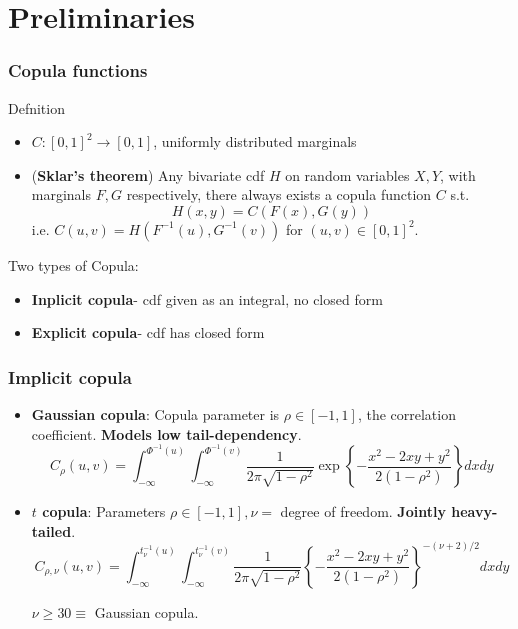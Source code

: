 \documentclass[handout,10pt]{beamer}
\newcommand{\colubf}{\color{UniBlue} \bf}
\begin{document}
\section{Preliminaries}

\begin{frame}
\frametitle{Copula functions}
\begin{block}{Defnition}
\begin{itemize}
\item $C:[0,1]^2\rightarrow [0,1]$, uniformly distributed marginals
\item (\textbf{Sklar's theorem}) Any bivariate cdf $H$ on random variables $X,Y$, with marginals $F,G$ respectively, there always exists a copula function $C$ s.t.
$$ H(x,y) = C(F(x),G(y)) $$
i.e. $C(u,v) = H(F^{-1}(u), G^{-1}(v))$ for $(u,v)\in[0,1]^2$.
\end{itemize}
\end{block}

Two types of Copula:
\begin{itemize}
\item \textbf{Inplicit copula}- cdf given as an integral, no closed form
\item \textbf{Explicit copula}- cdf has closed form
\end{itemize}
\end{frame}

\begin{frame}
\frametitle{Implicit copula}
\begin{example}
\begin{itemize}
\item \textbf{Gaussian copula}: Copula parameter is $\rho\in[-1,1]$, the correlation coefficient. {\colubf Models low tail-dependency}.
$$ C_\rho(u,v) = \int_{-\infty}^{\Phi^{-1}(u)}\int_{-\infty}^{\Phi^{-1}(v)} \frac{1}{2\pi\sqrt{1-\rho^2}} \exp\left\{-\frac{x^2-2xy+y^2}{2(1-\rho^2)}\right\}dxdy$$

\item \textbf{$t$ copula}: Parameters $\rho\in [-1,1], \nu=$ degree of freedom. {\colubf Jointly heavy-tailed}.
$$ C_{\rho,\nu}(u,v) = \int_{-\infty}^{t_\nu^{-1}(u)}\int_{-\infty}^{t_\nu^{-1}(v)} \frac{1}{2\pi\sqrt{1-\rho^2}} \left\{-\frac{x^2-2xy+y^2}{2(1-\rho^2)}\right\}^{-(\nu+2)/2}dxdy $$

$\nu\geq 30 \equiv$ Gaussian copula.

\end{itemize}
\end{example}
\end{frame}
\end{document}
